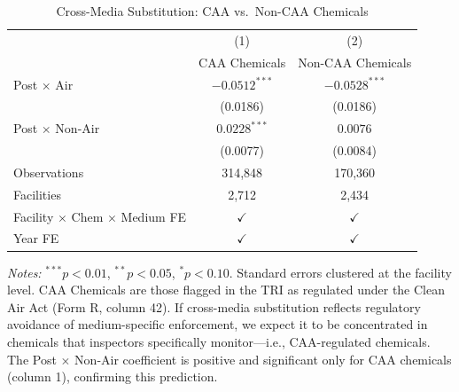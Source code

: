 \begin{table}[t]
\centering
\caption{Cross-Media Substitution: CAA vs.\ Non-CAA Chemicals}
\label{tab:mechanism}
\begin{tabular}{lcc}
\hline\hline
& (1) & (2) \\
& CAA Chemicals & Non-CAA Chemicals \\
\hline
Post $\times$ Air & $-0.0512^{***}$ & $-0.0528^{***}$ \\
& (0.0186) & (0.0186) \\[4pt]
Post $\times$ Non-Air & $0.0228^{***}$ & $0.0076$ \\
& (0.0077) & (0.0084) \\
\hline
Observations & 314,848 & 170,360 \\
Facilities & 2,712 & 2,434 \\
Facility $\times$ Chem $\times$ Medium FE & $\checkmark$ & $\checkmark$ \\
Year FE & $\checkmark$ & $\checkmark$ \\
\hline\hline
\end{tabular}
\vspace{0.3em}
\begin{minipage}{\textwidth}
\footnotesize
\textit{Notes:} $^{***}p<0.01$, $^{**}p<0.05$, $^{*}p<0.10$. Standard errors clustered at the facility level. CAA Chemicals are those flagged in the TRI as regulated under the Clean Air Act (Form R, column 42). If cross-media substitution reflects regulatory avoidance of medium-specific enforcement, we expect it to be concentrated in chemicals that inspectors specifically monitor---i.e., CAA-regulated chemicals. The Post $\times$ Non-Air coefficient is positive and significant only for CAA chemicals (column 1), confirming this prediction.
\end{minipage}
\end{table}
